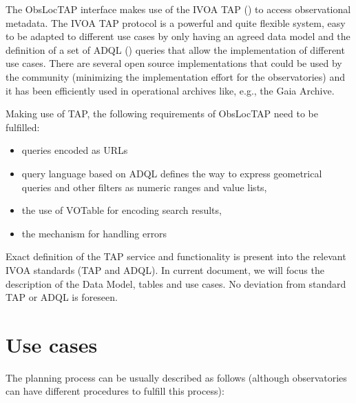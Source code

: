 \documentclass[11pt,a4paper]{ivoa}
\begin{document}
The ObsLocTAP interface makes use of the IVOA TAP (\cite{Pat10}) to access observational metadata. The IVOA TAP protocol is a powerful and quite flexible system, easy to be adapted to different use cases by only having an agreed data model and the definition of a set of ADQL (\cite{Ina08}) queries that allow the implementation of different use cases. There are several open source implementations that could be used by the community (minimizing the implementation effort for the observatories) and it has been efficiently used in operational archives like, e.g., the Gaia Archive.

Making use of TAP, the following requirements of ObsLocTAP need to be fulfilled:

\begin{itemize}
	\item queries encoded as URLs\par

	\item query language based on ADQL defines the way to express geometrical queries and other filters as numeric ranges and value lists, 

	\item the use of VOTable for encoding search results,

	\item the mechanism for handling errors
\end{itemize}

Exact definition of the TAP service and functionality is present into the relevant IVOA standards (TAP and ADQL). In current document, we will focus the description of the Data Model, tables and use cases. No deviation from standard TAP or ADQL is foreseen.

\section{Use cases}
The planning process can be usually described as follows (although observatories can have different procedures to fulfill this process): 
\end{document}
